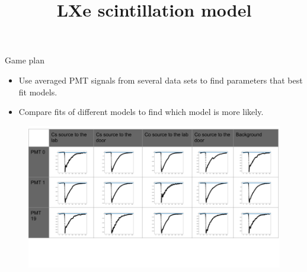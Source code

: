 \documentclass{beamer}
\title{LXe scintillation model}
\begin{document}
{ 
\frame{\titlepage}}

\begin{frame}{Game plan}
\begin{itemize}
\item Use averaged PMT signals from several data sets to find parameters that best fit models.\\
\item Compare fits of different models to find which model is more likely.
\end{itemize}  
\begin{figure}[H]
  \includegraphics[width=\linewidth]{WFs.png}
  \label{fig:boat1}
\end{figure}
\end{frame}


\end{document}
